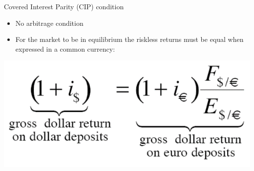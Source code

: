 \documentclass[10pt,hyperref={CJKbookmarks=true},xcolor=dvipsnames,aspectratio=169]{beamer}
\begin{document}
\begin{frame}{Covered Interest Parity (CIP) condition}
\begin{itemize}
	\item No arbitrage condition	
	\item For the market to be in equilibrium the riskless returns must be equal when expressed in a common currency:	
\end{itemize}
\centering
\includegraphics[scale=0.4]{fig/uip/cip1.png}
\end{frame}

\end{document}
